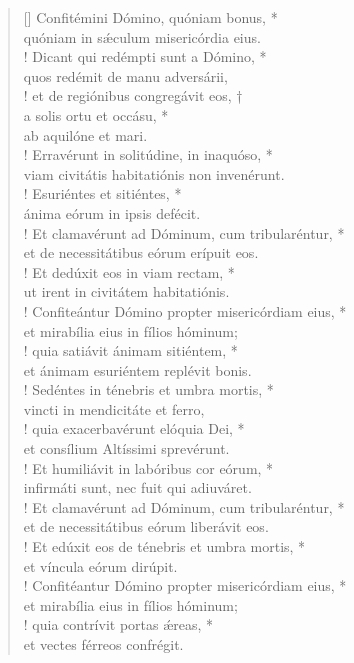 \begin{verse}[\versewidth]
Confitémini Dómino, quóniam bonus, *\\
quóniam in s\'{æ}culum misericórdia eius.\\!
\vin Dicant qui redémpti sunt a Dómino, *\\
\vin quos redémit de manu adversárii,\\!
et de regiónibus congregávit eos, †\\
a solis ortu et occásu, *\\
ab aquilóne et mari.\\!
\vin Erravérunt in solitúdine, in inaquóso, *\\
\vin viam civitátis habitatiónis non invenérunt.\\!
Esuriéntes et sitiéntes, *\\
ánima eórum in ipsis defécit.\\!
\vin Et clamavérunt ad Dóminum, cum tribularéntur, *\\
\vin et de necessitátibus eórum erípuit eos.\\!
Et dedúxit eos in viam rectam, *\\
ut irent in civitátem habitatiónis.\\!
\vin Confiteántur Dómino propter misericórdiam eius, *\\
\vin et mirabília eius in fílios hóminum;\\!
quia satiávit ánimam sitiéntem, *\\
et ánimam esuriéntem replévit bonis.\\!
\vin Sedéntes in ténebris et umbra mortis, *\\
\vin vincti in mendicitáte et ferro,\\!
quia exacerbavérunt elóquia Dei, *\\
et consílium Altíssimi sprevérunt.\\!
\vin Et humiliávit in labóribus cor eórum, *\\
\vin infirmáti sunt, nec fuit qui adiuváret.\\!
Et clamavérunt ad Dóminum, cum tribularéntur, *\\
et de necessitátibus eórum liberávit eos.\\!
\vin Et edúxit eos de ténebris et umbra mortis, *\\
\vin et víncula eórum dirúpit.\\!
Confitéantur Dómino propter misericórdiam eius, *\\
et mirabília eius in fílios hóminum;\\!
\vin quia contrívit portas \'{æ}reas, *\\
\vin et vectes férreos confrégit.\\
\end{verse}
